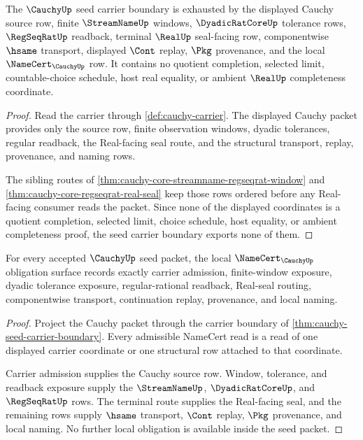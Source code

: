 \begin{theorem}
\label{thm:cauchy-seed-carrier-boundary}
The $\CauchyUp$ seed carrier boundary is exhausted by the displayed Cauchy source row, finite $\StreamNameUp$ windows, $\DyadicRatCoreUp$ tolerance rows, $\RegSeqRatUp$ readback, terminal $\RealUp$ seal-facing row, componentwise $\hsame$ transport, displayed $\Cont$ replay, $\Pkg$ provenance, and the local $\NameCert_{\CauchyUp}$ row. It contains no quotient completion, selected limit, countable-choice schedule, host real equality, or ambient $\RealUp$ completeness coordinate.
\end{theorem}
\begin{proof}
Read the carrier through \autoref{def:cauchy-carrier}. The displayed Cauchy packet provides only the source row, finite observation windows, dyadic tolerances, regular readback, the Real-facing seal route, and the structural transport, replay, provenance, and naming rows.

The sibling routes of \autoref{thm:cauchy-core-streamname-regseqrat-window} and \autoref{thm:cauchy-core-regseqrat-real-seal} keep those rows ordered before any Real-facing consumer reads the packet. Since none of the displayed coordinates is a quotient completion, selected limit, choice schedule, host equality, or ambient completeness proof, the seed carrier boundary exports none of them.
\end{proof}

\begin{theorem}
\label{thm:cauchy-seed-namecert-obligation}
For every accepted $\CauchyUp$ seed packet, the local $\NameCert_{\CauchyUp}$ obligation surface records exactly carrier admission, finite-window exposure, dyadic tolerance exposure, regular-rational readback, Real-seal routing, componentwise transport, continuation replay, provenance, and local naming.
\end{theorem}
\begin{proof}
Project the Cauchy packet through the carrier boundary of \autoref{thm:cauchy-seed-carrier-boundary}. Every admissible NameCert read is a read of one displayed carrier coordinate or one structural row attached to that coordinate.

Carrier admission supplies the Cauchy source row. Window, tolerance, and readback exposure supply the $\StreamNameUp$, $\DyadicRatCoreUp$, and $\RegSeqRatUp$ rows. The terminal route supplies the Real-facing seal, and the remaining rows supply $\hsame$ transport, $\Cont$ replay, $\Pkg$ provenance, and local naming. No further local obligation is available inside the seed packet.
\end{proof}

